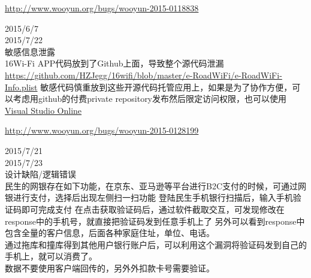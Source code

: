 \documentclass{leptc}
\begin{document}
\begin{center}
	\url{http://www.wooyun.org/bugs/wooyun-2015-0118838}
\end{center}
 2015/6/7 \\
 2015/7/22 \\
 敏感信息泄露 \\
 16Wi-Fi APP代码放到了Github上面，导致整个源代码泄漏 \url{https://github.com/HZJegg/16wifi/blob/master/e-RoadWiFi/e-RoadWiFi-Info.plist}
 敏感代码慎重放到这些开源代码托管应用上，如果是为了协作方便，可以考虑用github的付费private repository发布然后限定访问权限，也可以使用\href{https://www.visualstudio.com/en-us/products/what-is-visual-studio-online-vs.aspx}{Visual Studio Online}\\

\begin{center}
	\url{http://www.wooyun.org/bugs/wooyun-2015-0128199}
\end{center}
 2015/7/21 \\
 2015/7/23 \\
 设计缺陷/逻辑错误 \\
  民生的网银存在如下功能，在京东、亚马逊等平台进行B2C支付的时候，可通过网银进行支付，选择后出现左侧扫一扫功能  登陆民生手机银行扫描后，输入手机验证码即可完成支付  在点击获取验证码后，通过软件截取交互，可发现修改在response中的手机号，就直接把验证码发到任意手机上了 另外可以看到response中包含全量的客户信息，后面各种家庭住址，单位、电话。\\
 通过拖库和撞库得到其他用户银行账户后，可以利用这个漏洞将验证码发到自己的手机上，就可以消费了。\\
 数据不要使用客户端回传的，另外外扣款卡号需要验证。\\
\end{document}
